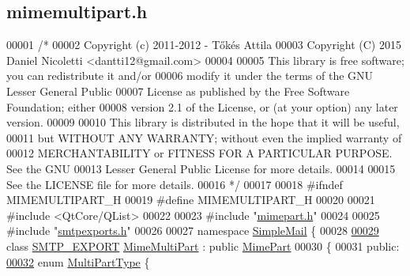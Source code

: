 \hypertarget{mimemultipart_8h_source}{}\subsection{mimemultipart.\+h}
\label{mimemultipart_8h_source}

\begin{DoxyCode}
00001 \textcolor{comment}{/*}
00002 \textcolor{comment}{  Copyright (c) 2011-2012 - Tőkés Attila}
00003 \textcolor{comment}{  Copyright (C) 2015 Daniel Nicoletti <dantti12@gmail.com>}
00004 \textcolor{comment}{}
00005 \textcolor{comment}{  This library is free software; you can redistribute it and/or}
00006 \textcolor{comment}{  modify it under the terms of the GNU Lesser General Public}
00007 \textcolor{comment}{  License as published by the Free Software Foundation; either}
00008 \textcolor{comment}{  version 2.1 of the License, or (at your option) any later version.}
00009 \textcolor{comment}{}
00010 \textcolor{comment}{  This library is distributed in the hope that it will be useful,}
00011 \textcolor{comment}{  but WITHOUT ANY WARRANTY; without even the implied warranty of}
00012 \textcolor{comment}{  MERCHANTABILITY or FITNESS FOR A PARTICULAR PURPOSE.  See the GNU}
00013 \textcolor{comment}{  Lesser General Public License for more details.}
00014 \textcolor{comment}{}
00015 \textcolor{comment}{  See the LICENSE file for more details.}
00016 \textcolor{comment}{*/}
00017 
00018 \textcolor{preprocessor}{#ifndef MIMEMULTIPART\_H}
00019 \textcolor{preprocessor}{#define MIMEMULTIPART\_H}
00020 
00021 \textcolor{preprocessor}{#include <QtCore/QList>}
00022 
00023 \textcolor{preprocessor}{#include "\hyperlink{mimepart_8h}{mimepart.h}"}
00024 
00025 \textcolor{preprocessor}{#include "\hyperlink{smtpexports_8h}{smtpexports.h}"}
00026 
00027 \textcolor{keyword}{namespace }\hyperlink{namespace_simple_mail}{SimpleMail} \{
00028 
\hyperlink{class_simple_mail_1_1_mime_multi_part}{00029} \textcolor{keyword}{class }\hyperlink{smtpexports_8h_ac580c9660cb24a34b13807f4eb0e1bd0}{SMTP\_EXPORT} \hyperlink{class_simple_mail_1_1_mime_multi_part}{MimeMultiPart} : \textcolor{keyword}{public} \hyperlink{class_simple_mail_1_1_mime_part}{MimePart}
00030 \{
00031 \textcolor{keyword}{public}:
\hyperlink{class_simple_mail_1_1_mime_multi_part_a6bef6836f893f87c64c4ff0cb9a93e53}{00032}     \textcolor{keyword}{enum} \hyperlink{class_simple_mail_1_1_mime_multi_part_a6bef6836f893f87c64c4ff0cb9a93e53}{MultiPartType} \{

\end{DoxyCode}
